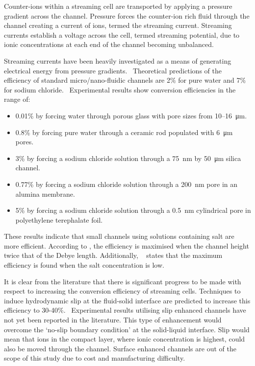 \documentclass[10pt,final,journal]{IEEEtran}
\begin{document}
    Counter-ions within a streaming cell are transported by applying a pressure gradient across the channel.
    Pressure forces the counter-ion rich fluid through the channel creating a current of ions, termed the streaming current.
    Streaming currents establish a voltage across the cell, termed streaming potential, due to ionic concentrations at each end of the channel becoming unbalanced.

    Streaming currents have been heavily investigated as a means of generating electrical energy from pressure gradients.~\cite{Chang2009,Daiguji2006,Daiguji2004b,Davidson2008a,Davidson2008,CherngHon2012,Jiao2014,Lu2006,Olthuis2005,Osterle1964,Pennathur2007,Ren2008a,VanderHeyden2006,Heyden2007,Xie2008,Yang2003}
    Theoretical predictions of the efficiency of standard micro/nano-fluidic channels are 2\% for pure water and 7\% for sodium chloride.~\cite{VanderHeyden2006}
    Experimental results show conversion efficiencies in the range of:
    \begin{itemize}
        \item 0.01\% by forcing water through porous glass with pore sizes from 10\thinspace--\SI{16}{\micro\metre}.~\cite{Yang2003}
        \item 0.8\% by forcing pure water through a ceramic rod populated with \SI{6}{\micro\metre} pores.~\cite{Yang2004}
        \item 3\% by forcing a sodium chloride solution through a \SI{75}{\nano\metre} by \SI{50}{\micro\metre} silica channel.~\cite{Heyden2007}
        \item 0.77\% by forcing a sodium chloride solution through a \SI{200}{\nano\metre} pore in an alumina membrane.~\cite{Lu2006}
        \item 5\% by forcing a sodium chloride solution through a \SI{0.5}{\nano\metre} cylindrical pore in polyethylene terephalate foil.~\cite{Xie2008}
    \end{itemize}
    These results indicate that small channels using solutions containing salt are more efficient.
    According to \cite{Daiguji2004b}, the efficiency is maximised when the channel height twice that of the Debye length.
    Additionally, ~\cite{VanderHeyden2006} states that the maximum efficiency is found when the salt concentration is low.


    It is clear from the literature that there is significant progress to be made with respect to increasing the conversion efficiency of streaming cells.
    Techniques to induce hydrodynamic slip at the fluid-solid interface are predicted to increase this efficiency to 30-40\%.~\cite{Davidson2008a, Ren2008a}
    Experimental results utilising slip enhanced channels have not yet been reported in the literature.
    This type of enhancement would overcome the `no-slip boundary condition' at the solid-liquid interface.
    Slip would mean that ions in the compact layer, where ionic concentration is highest, could also be moved through the channel.
    Surface enhanced channels are out of the scope of this study due to cost and manufacturing difficulty.
\end{document}

